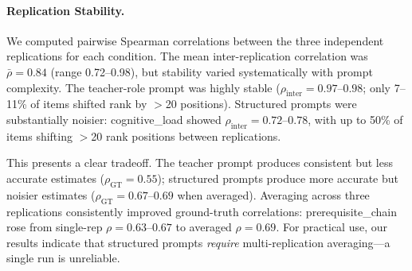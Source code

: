 
\paragraph{Replication Stability.}
We computed pairwise Spearman correlations between the three independent replications for each condition. The mean inter-replication correlation was $\bar{\rho} = 0.84$ (range 0.72--0.98), but stability varied systematically with prompt complexity. The teacher-role prompt was highly stable ($\rho_{\mathrm{inter}} = 0.97$--$0.98$; only 7--11\% of items shifted rank by $>$20 positions). Structured prompts were substantially noisier: cognitive\_load showed $\rho_{\mathrm{inter}} = 0.72$--$0.78$, with up to 50\% of items shifting $>$20 rank positions between replications.

This presents a clear tradeoff. The teacher prompt produces consistent but less accurate estimates ($\rho_{\mathrm{GT}} = 0.55$); structured prompts produce more accurate but noisier estimates ($\rho_{\mathrm{GT}} = 0.67$--$0.69$ when averaged). Averaging across three replications consistently improved ground-truth correlations: prerequisite\_chain rose from single-rep $\rho = 0.63$--$0.67$ to averaged $\rho = 0.69$. For practical use, our results indicate that structured prompts \emph{require} multi-replication averaging---a single run is unreliable.
